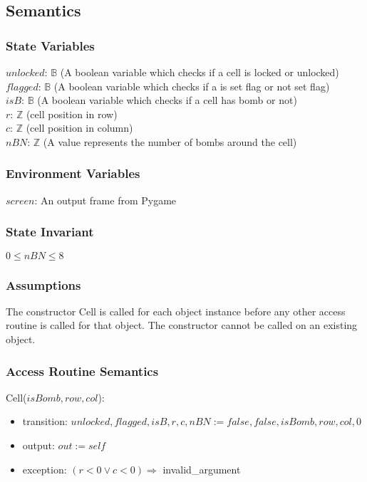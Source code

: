 \documentclass[12pt]{article}
\begin{document}
\subsection {Semantics}

\subsubsection {State Variables}

$unlocked$: $\mathbb{B}$ (A boolean variable which checks if a cell is locked or unlocked)\\
$flagged$: $\mathbb{B}$ (A boolean variable which checks if a is set flag or not set flag)\\
$isB$: $\mathbb{B}$ (A boolean variable which checks if a cell has bomb or not)\\
$r$: $\mathbb{Z}$ (cell position in row)\\
$c$: $\mathbb{Z}$ (cell position in column)\\
$nBN$: $\mathbb{Z}$ (A value represents the number of bombs around the cell)

\subsubsection {Environment Variables}
$screen$: An output frame from Pygame

\subsubsection {State Invariant}

$0 \leq nBN \leq 8$

\subsubsection {Assumptions}

The constructor Cell is called for each object instance before any other
access routine is called for that object.  The constructor cannot be called on
an existing object.

\subsubsection {Access Routine Semantics}

Cell($isBomb, row, col$):
\begin{itemize}
\item transition: $unlocked, flagged, isB, r, c, nBN := false, false, isBomb, row, col, 0$
\item output: $out := \mathit{self}$
\item exception: $(r<0 \lor c<0) \Rightarrow $ invalid\_argument
\end{itemize}
\end{document}
